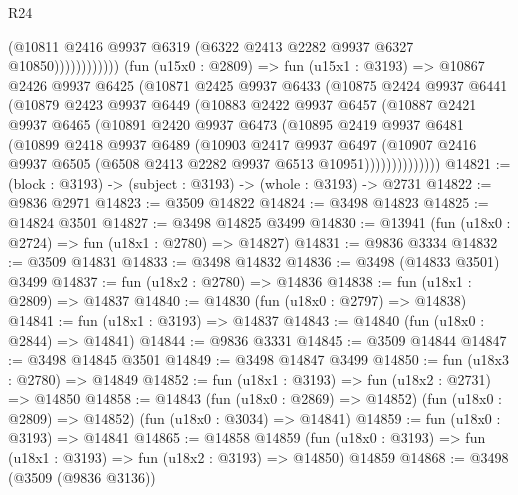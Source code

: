 \begin{lexlean}{R24}
\begin{coremodule}
                            (@10811
                              @2416
                              @9937
                              @6319
                              (@6322 @2413 @2282 @9937 @6327 @10850))))))))))))
        (fun (u15x0 : @2809) =>
        fun (u15x1 : @3193) =>
        @10867
          @2426
          @9937
          @6425
          (@10871
            @2425
            @9937
            @6433
            (@10875
              @2424
              @9937
              @6441
              (@10879
                @2423
                @9937
                @6449
                (@10883
                  @2422
                  @9937
                  @6457
                  (@10887
                    @2421
                    @9937
                    @6465
                    (@10891
                      @2420
                      @9937
                      @6473
                      (@10895
                        @2419
                        @9937
                        @6481
                        (@10899
                          @2418
                          @9937
                          @6489
                          (@10903
                            @2417
                            @9937
                            @6497
                            (@10907
                              @2416
                              @9937
                              @6505
                              (@6508 @2413 @2282 @9937 @6513 @10951))))))))))))))
@14821 := (block : @3193) -> (subject : @3193) -> (whole : @3193) -> @2731
@14822 := @9836 @2971
@14823 := @3509 @14822
@14824 := @3498 @14823
@14825 := @14824 @3501
@14827 := @3498 @14825 @3499
@14830 := @13941 (fun (u18x0 : @2724) => fun (u18x1 : @2780) => @14827)
@14831 := @9836 @3334
@14832 := @3509 @14831
@14833 := @3498 @14832
@14836 := @3498 (@14833 @3501) @3499
@14837 := fun (u18x2 : @2780) => @14836
@14838 := fun (u18x1 : @2809) => @14837
@14840 := @14830 (fun (u18x0 : @2797) => @14838)
@14841 := fun (u18x1 : @3193) => @14837
@14843 := @14840 (fun (u18x0 : @2844) => @14841)
@14844 := @9836 @3331
@14845 := @3509 @14844
@14847 := @3498 @14845 @3501
@14849 := @3498 @14847 @3499
@14850 := fun (u18x3 : @2780) => @14849
@14852 := fun (u18x1 : @3193) => fun (u18x2 : @2731) => @14850
@14858 := @14843
    (fun (u18x0 : @2869) => @14852)
    (fun (u18x0 : @2809) => @14852)
    (fun (u18x0 : @3034) => @14841)
@14859 := fun (u18x0 : @3193) => @14841
@14865 := @14858
    @14859
    (fun (u18x0 : @3193) => fun (u18x1 : @3193) => fun (u18x2 : @3193) => @14850)
    @14859
@14868 := @3498 (@3509 (@9836 @3136))

\end{coremodule}
\end{lexlean}
